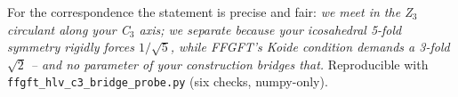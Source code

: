 For the correspondence the statement is precise and fair: \emph{we meet in the
Z$_3$ circulant along your C$_3$ axis; we separate because your icosahedral 5-fold
symmetry rigidly forces $1/\sqrt5$, while FFGFT's Koide condition demands a 3-fold
$\sqrt2$ -- and no parameter of your construction bridges that.} Reproducible with
\texttt{ffgft\_hlv\_c3\_bridge\_probe.py} (six checks, numpy-only).
